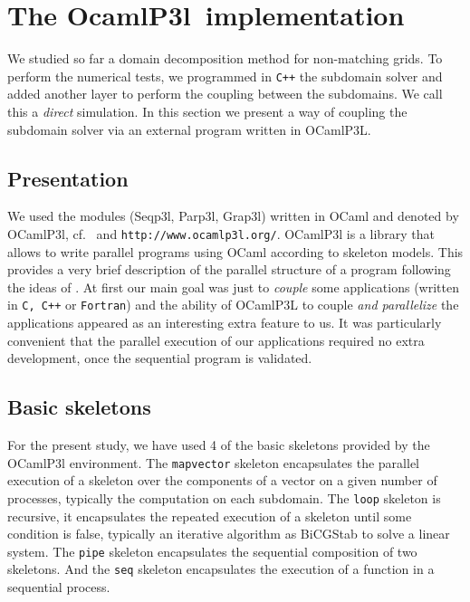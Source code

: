 \documentclass{article}
\newcommand{\ocamlpiiil}{{\sf OcamlP3l}}
\begin{document}
\section{The \ocamlpiiil\ implementation}
%

We studied so far a domain decomposition method for non-matching grids. To
perform the numerical tests, we programmed in {\tt C++} the subdomain solver
and added another layer to perform the coupling between the subdomains. We call
this a \emph{direct} simulation. In this section we present a way of coupling
the subdomain solver via an external program written in OCamlP3L. 
\subsection{Presentation}
We used the modules (Seqp3l, Parp3l, Grap3l) written in OCaml and denoted by
OCamlP3l, cf.~\cite{Ocamlp3lMlw98} and {\tt http://www.ocamlp3l.org/}.
OCamlP3l is a library that allows to write parallel programs using OCaml
according to skeleton models. This provides a very brief description of the
parallel structure of a program following the ideas of \cite{skeletoncole89}.
At first our main goal was just to {\it couple} some applications (written in
{\tt C, C++} or {\tt Fortran}) and the ability of OCamlP3L to couple {\it and
  parallelize} the applications appeared as an interesting extra feature to us.
It was particularly convenient that the parallel execution of our applications
required no extra development, once the sequential program is validated.

\subsection{Basic skeletons}

For the present study, we have used 4 of the basic skeletons provided by the
OCamlP3l environment.  The {\tt mapvector} skeleton encapsulates the parallel
execution of a skeleton over the components of a vector on a given number of
processes, typically the computation on each subdomain.  The {\tt loop}
skeleton is recursive, it encapsulates the repeated execution of a skeleton
until some condition is false, typically an iterative algorithm as BiCGStab to
solve a linear system.  The {\tt pipe} skeleton encapsulates the sequential
composition of two skeletons.  And the {\tt seq} skeleton encapsulates the
execution of a function in a sequential process.
\end{document}
